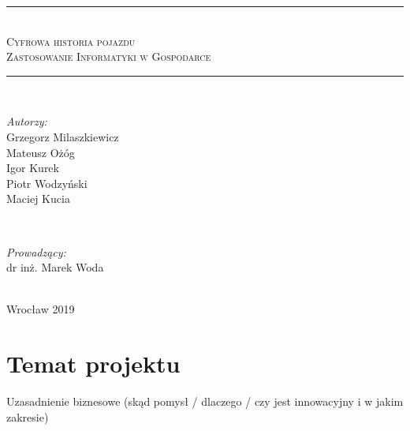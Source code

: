 \documentclass[12pt]{article}
\begin{document}
\begin{titlepage}
\newcommand{\LINE}{\rule{\linewidth}{0.7mm}}
\center
\LINE \\[0.5cm]
\Huge\textsc{Cyfrowa historia pojazdu}\\ [5mm]
\normalsize\textsc{Zastosowanie Informatyki w Gospodarce}  \\[0.5cm]
\LINE \\[3cm]
\begin{minipage}{0.5\textwidth}
\begin{flushleft} \large
\emph{Autorzy:}
		\\Grzegorz Milaszkiewicz %
		\\Mateusz Ożóg %
		\\Igor Kurek
		\\Piotr Wodzyński
		\\Maciej Kucia 
\end{flushleft}
\end{minipage}
~
\begin{minipage}{0.45\textwidth}
\begin{flushright} \large
\emph{Prowadzący:} \\
dr inż. Marek Woda
\end{flushright}
\end{minipage}\\[2cm]
\vfill
\center Wrocław 2019
\end{titlepage}

\renewcommand{\contentsname}{Spis treści}
\tableofcontents
\newpage

\section{Temat projektu}
Uzasadnienie biznesowe (skąd pomysł / dlaczego / czy jest innowacyjny i w jakim zakresie)\\
\end{document}
